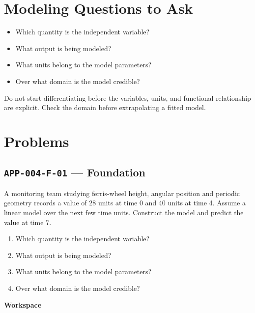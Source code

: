 \documentclass[11pt]{book}
\newcommand{\pid}[1]{\texttt{#1}}
\newcommand{\workspace}{\par\vspace{0.7in}\hrulefill\par\vspace{0.55in}\hrulefill\par}
\begin{document}
\section*{Modeling Questions to Ask}\begin{itemize}
\item Which quantity is the independent variable?
\item What output is being modeled?
\item What units belong to the model parameters?
\item Over what domain is the model credible?
\end{itemize}
\begin{errorbox}Do not start differentiating before the variables, units, and functional relationship are explicit. Check the domain before extrapolating a fitted model.\end{errorbox}
\section*{Problems}
\subsection*{\pid{APP-004-F-01} — Foundation}
\begin{problembox}
A monitoring team studying ferris-wheel height, angular position and periodic geometry records a value of 28 units at time 0 and 40 units at time 4. Assume a linear model over the next few time units. Construct the model and predict the value at time 7.
\end{problembox}
\begin{promptbox}\begin{enumerate}
\item Which quantity is the independent variable?
\item What output is being modeled?
\item What units belong to the model parameters?
\item Over what domain is the model credible?
\end{enumerate}\end{promptbox}
\textbf{Workspace}\workspace
{}
\end{document}
